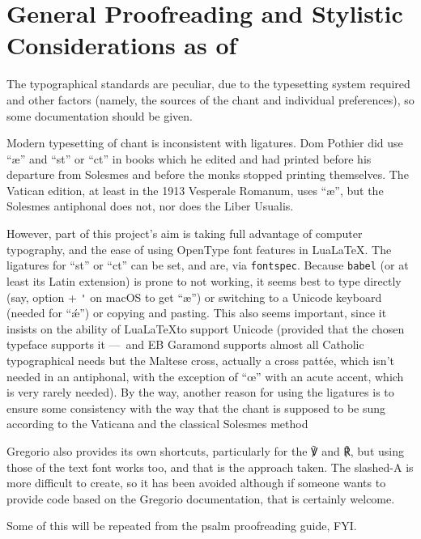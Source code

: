 \documentclass[11pt]{article}
\begin{document}
\section{General Proofreading and Stylistic Considerations as of}


The typographical standards are peculiar, due to the typesetting system required and other factors (namely, the sources of the chant and individual preferences), so some documentation should be given.

Modern typesetting of chant is inconsistent with ligatures. Dom Pothier did use ``æ'' and ``st'' or ``ct'' in books which he edited and had printed before his departure from Solesmes and before the monks stopped printing themselves. The Vatican edition, at least in the 1913 Vesperale Romanum, uses ``æ'', but the Solesmes antiphonal does not, nor does the Liber Usualis.

However, part of this project's aim is taking full advantage of computer typography, and the ease of using OpenType font features in Lua\LaTeX. The ligatures for ``st'' or ``ct'' can be set, and are, via \verb|fontspec|. Because \verb|babel| (or at least its Latin extension) is prone to not working, it seems best to type directly (say, option + \verb|'| on macOS to get ``æ'') or switching to a Unicode keyboard (needed for ``ǽ'') or copying and pasting. This also seems important, since it insists on the ability of Lua\LaTeX to support Unicode (provided that the chosen typeface supports it — and EB Garamond supports almost all Catholic typographical needs but the Maltese cross, actually a cross pattée, which isn't needed in an antiphonal, with the exception of ``œ'' with an acute accent, which is very rarely needed). By the way, another reason for using the ligatures is to ensure some consistency with the way that the chant is supposed to be sung according to the Vaticana and the classical Solesmes method

Gregorio also provides its own shortcuts, particularly for the ℣ and ℟, but using those of the text font works too, and that is the approach taken. The slashed-A is more difficult to create, so it has been avoided although if someone wants to provide code based on the Gregorio documentation, that is certainly welcome.

Some of this will be repeated from the psalm proofreading guide, FYI. 
\end{document}
